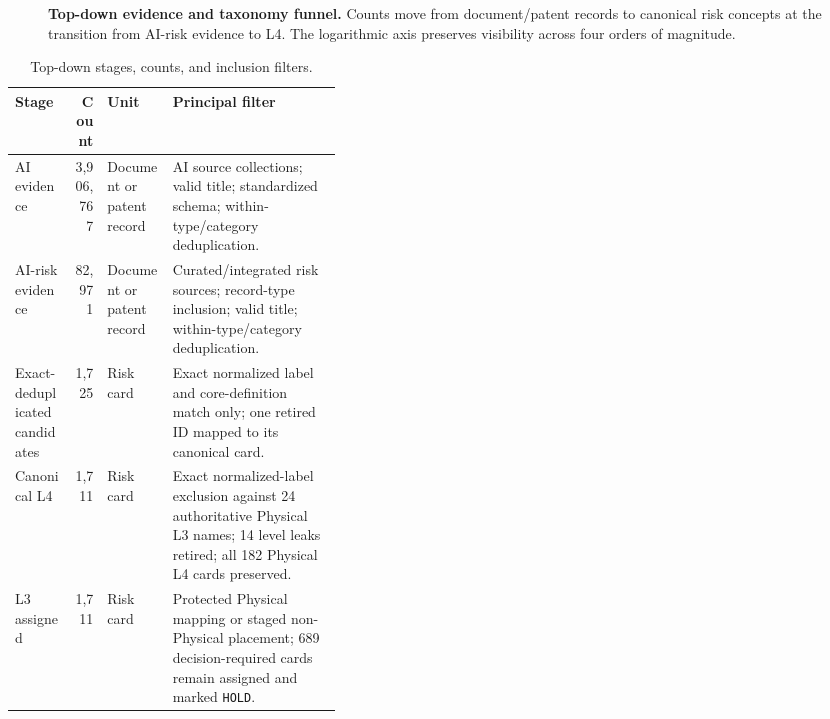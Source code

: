 \documentclass[11pt,a4paper]{article}
\newcommand{\code}[1]{\texttt{#1}}
\begin{document}
\begin{figure}[H]
\centering
{}
\caption{\textbf{Top-down evidence and taxonomy funnel.} Counts move from
document/patent records to canonical risk concepts at the transition from
AI-risk evidence to L4. The logarithmic axis preserves visibility across four
orders of magnitude.}
\label{fig:funnel}
\end{figure}

\begin{table}[H]
\centering
\caption{Top-down stages, counts, and inclusion filters.}
\label{tab:funnel}
\small
\begin{tabularx}{\linewidth}{L{0.18\linewidth}r L{0.20\linewidth}Y}
\toprule
Stage & Count & Unit & Principal filter \\
\midrule
AI evidence & 3,906,767 & Document or patent record & AI source collections; valid title; standardized schema; within-type/category deduplication. \\
AI-risk evidence & 82,971 & Document or patent record & Curated/integrated risk sources; record-type inclusion; valid title; within-type/category deduplication. \\
Exact-deduplicated candidates & 1,725 & Risk card & Exact normalized label and core-definition match only; one retired ID mapped to its canonical card. \\
Canonical L4 & 1,711 & Risk card & Exact normalized-label exclusion against 24 authoritative Physical L3 names; 14 level leaks retired; all 182 Physical L4 cards preserved. \\
L3 assigned & 1,711 & Risk card & Protected Physical mapping or staged non-Physical placement; 689 decision-required cards remain assigned and marked \code{HOLD}. \\
\bottomrule
\end{tabularx}
\end{table}
\end{document}
